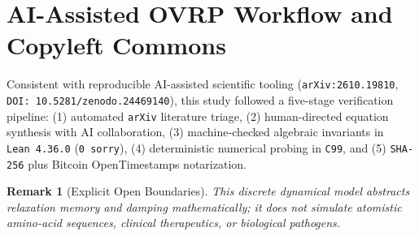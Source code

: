 \documentclass[11pt,a4paper]{article}
\newtheorem{remark}{Remark}
\begin{document}
\section{AI-Assisted OVRP Workflow and Copyleft Commons}
Consistent with reproducible AI-assisted scientific tooling (\texttt{arXiv:2610.19810}, \texttt{DOI: 10.5281/zenodo.24469140}), this study followed a five-stage verification pipeline: (1) automated \texttt{arXiv} literature triage, (2) human-directed equation synthesis with AI collaboration, (3) machine-checked algebraic invariants in \texttt{Lean~4.36.0} (\texttt{0~sorry}), (4) deterministic numerical probing in \texttt{C99}, and (5) \texttt{SHA-256} plus Bitcoin OpenTimestamps notarization.

\begin{remark}[Explicit Open Boundaries]
This discrete dynamical model abstracts relaxation memory and damping mathematically; it does not simulate atomistic amino-acid sequences, clinical therapeutics, or biological pathogens.
\end{remark}
\end{document}
